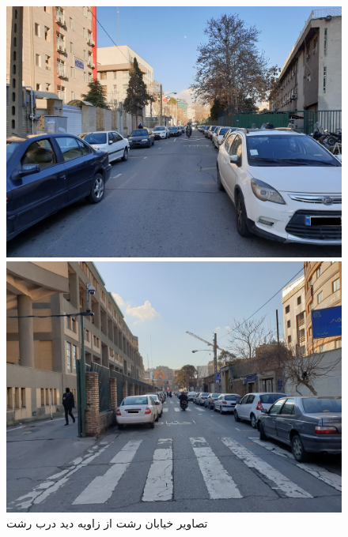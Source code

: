 \begin{figure}[h!]
    \begin{minipage}{0.5\textwidth}
        \centering
        \includegraphics[width=1\linewidth]{figures/Rasht_Picture1.jpg}
    \end{minipage}
    \hspace{0.3cm}
    \begin{minipage}{0.5\textwidth}
        \centering
        \includegraphics[width=1\linewidth]{figures/Rasht_Picture2.jpg}
    \end{minipage}
    \begin{center}
        \caption{تصاویر خیابان رشت از زاویه دید درب رشت}
    \end{center}
    \label{fig:Rasht_Pictures}
\end{figure} 

